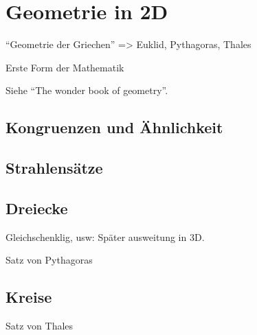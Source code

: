 \chapter{Geometrie in 2D}
"`Geometrie der Griechen"' => Euklid, Pythagoras, Thales

Erste Form der Mathematik

Siehe "`The wonder book of geometry"'. 

\section{Kongruenzen und Ähnlichkeit}

\section{Strahlensätze}

\section{Dreiecke}
Gleichschenklig, usw: Später ausweitung in 3D. 

Satz von Pythagoras

\section{Kreise}
Satz von Thales